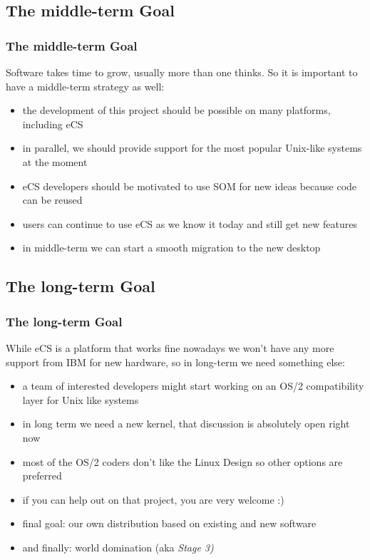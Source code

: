 \documentclass{beamer}
\begin{document}
\subsection{The middle-term Goal}
\begin{frame}
\frametitle{The middle-term Goal}
Software takes time to grow, usually  more than one thinks. So it is important
to have a middle-term strategy as well:
\begin{itemize}
  \item the development of this project should be possible on many platforms, including eCS
  \item in parallel, we should provide support for the most popular Unix-like systems at the moment
  \item eCS developers should be motivated to use SOM for new ideas because code can be reused
  \item users can continue to use eCS as we know it today and still get new features
  \item in middle-term we can start a smooth migration to the new desktop
\end{itemize}
\end{frame}


\subsection{The long-term Goal}
\begin{frame}
\frametitle{The long-term Goal}
While eCS is a platform that works fine nowadays we won't have any more support from IBM for new hardware, so in long-term we need something else:
\begin{itemize}
  \item a team of interested developers might start working on an OS/2 compatibility layer for Unix like systems
  \item in long term we need a new kernel, that discussion is absolutely open right now
  \item most of the OS/2 coders don't like the Linux Design so other options are preferred
  \item if you can help out on that project, you are very welcome :)
  \item final goal: our own distribution based on existing and new software
  \item and finally: world domination (aka \it{Stage 3})
\end{itemize}
\end{frame}
\end{document}
